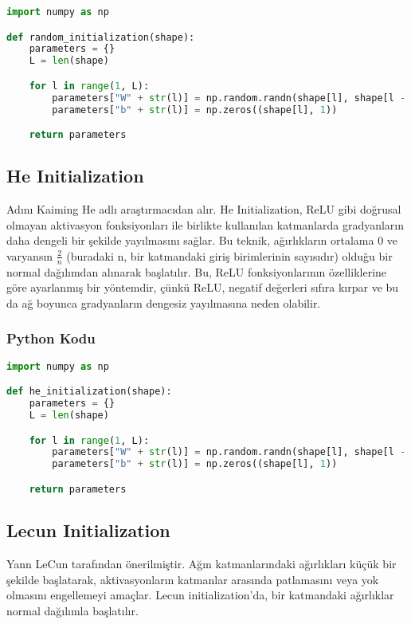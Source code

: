 \begin{lstlisting}[language=Python]
import numpy as np

def random_initialization(shape):
    parameters = {}
    L = len(shape)

    for l in range(1, L):
        parameters["W" + str(l)] = np.random.randn(shape[l], shape[l - 1]) * 10
        parameters["b" + str(l)] = np.zeros((shape[l], 1))

    return parameters
\end{lstlisting}

\newpage

\subsection{He Initialization}
Adını Kaiming He adlı araştırmacıdan alır. He Initialization, ReLU gibi doğrusal olmayan aktivasyon fonksiyonları ile birlikte kullanılan katmanlarda gradyanların daha dengeli bir şekilde yayılmasını sağlar. Bu teknik, ağırlıkların ortalama 0 ve varyansın $\frac{2}{n}$ (buradaki n, bir katmandaki giriş birimlerinin sayısıdır) olduğu bir normal dağılımdan alınarak başlatılır. Bu, ReLU fonksiyonlarının özelliklerine göre ayarlanmış bir yöntemdir, çünkü ReLU, negatif değerleri sıfıra kırpar ve bu da ağ boyunca gradyanların dengesiz yayılmasına neden olabilir.

\subsubsection{Python Kodu}

\begin{lstlisting}[language=Python]
import numpy as np

def he_initialization(shape):
    parameters = {}
    L = len(shape)

    for l in range(1, L):
        parameters["W" + str(l)] = np.random.randn(shape[l], shape[l - 1]) * np.sqrt(2 / shape[l - 1])
        parameters["b" + str(l)] = np.zeros((shape[l], 1))

    return parameters
\end{lstlisting}

\newpage

\subsection{Lecun Initialization}

Yann LeCun tarafından önerilmiştir. Ağın katmanlarındaki ağırlıkları küçük bir şekilde başlatarak, aktivasyonların katmanlar arasında patlamasını veya yok olmasını engellemeyi amaçlar. Lecun initialization'da, bir katmandaki ağırlıklar normal dağılımla başlatılır.

